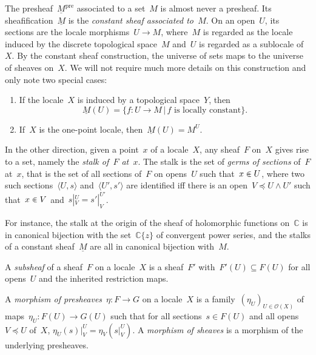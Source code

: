 \documentclass{ws-rv9x6}
\renewcommand{\O}{\mathcal{O}}
\newcommand{\CC}{\mathbb{C}}
\renewcommand{\_}{\mathpunct{.}}
\newcommand{\?}{\,{:}\,}
\begin{document}
\label{par:constant-sheaf}%
The presheaf~$\underline{M}^\mathrm{pre}$ associated to a set~$M$ is almost
never a presheaf. Its sheafification~$\underline{M}$ is the \emph{constant sheaf associated
to~$M$}\label{page:constant-sheaf}. On an open~$U$, its sections are the locale
morphisms~$U \to M$, where~$M$ is regarded as the locale induced by
the discrete topological space~$M$ and~$U$ is regarded as a sublocale of~$X$.
By the constant sheaf construction, the universe of sets maps to the universe
of sheaves on~$X$. We will not require much more details on this construction
and only note two special cases:
\begin{enumerate}
\item If the locale~$X$ is induced by a topological space~$Y$, then
\[ \underline{M}(U) = \{ f : U \to M \,|\, \text{$f$ is locally constant} \}. \]
\item If~$X$ is the one-point locale, then~$\underline{M}(U) = M^U$.
\end{enumerate}

In the other direction, given a point~$x$ of a locale~$X$, any sheaf~$F$ on~$X$ gives
rise to a set, namely the \emph{stalk of~$F$ at~$x$}. The stalk is the set of
\emph{germs of sections} of~$F$ at~$x$, that is the set of all sections of~$F$
on opens~$U$ such that~$x \inplus U$, where two such sections~$\langle U,s
\rangle$ and~$\langle U',s' \rangle$ are identified iff there is an open~$V
\preceq U \wedge U'$ such that~$x \inplus V$ and~$s|^U_V = s'|^{U'}_V$.

For instance, the stalk at the origin of the sheaf of holomorphic functions
on~$\CC$ is in canonical bijection with the set~$\CC\{z\}$ of convergent power
series, and the stalks of a constant sheaf~$\underline{M}$ are all in canonical
bijection with~$M$.

\begin{definition}A \emph{subsheaf} of a sheaf~$F$ on a locale~$X$ is a
sheaf~$F'$ with~$F'(U) \subseteq F(U)$ for all opens~$U$ and the inherited
restriction maps.\end{definition}

\begin{definition}A \emph{morphism of presheaves}~$\eta : F \to G$ on a
locale~$X$ is a family~$(\eta_U)_{U \in \O(X)}$ of maps~$\eta_U : F(U) \to
G(U)$ such that for all sections~$s \in F(U)$ and all opens~$V \preceq U$
of~$X$, $\eta_U(s)|^U_V = \eta_V(s|^U_V)$. A \emph{morphism of sheaves} is a
morphism of the underlying presheaves.
\end{definition}
\end{document}

